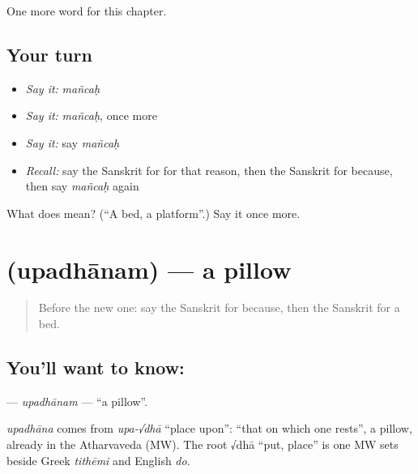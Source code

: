 \begin{grammarlens}[title={What you've built}]
One more word for this chapter.
\end{grammarlens}

\subsection*{Your turn}
\begin{itemize}
\raggedright
  \item \emph{Say it:} \emph{mañcaḥ}
  \item \emph{Say it:} \emph{mañcaḥ}, once more
  \item \emph{Say it:} say \emph{mañcaḥ}
  \item \emph{Recall:} say the Sanskrit for for that reason, then the Sanskrit for because, then say \emph{mañcaḥ} again
\end{itemize}

\begin{tcolorbox}[breakable,colback=teal!4,colframe=teal!35!black,title={Before you move on}]
What does  mean? (\textquotedblleft{}A bed, a platform\textquotedblright{}.) Say it once more.
\end{tcolorbox}
\section[\texorpdfstring{\sk{उपधानम्} (upadhānam)}{उपधानम् (upadhānam)}]{ (upadhānam) — a pillow}

\label{lesson:SA-C99-upadhanam}



\begin{quote}
Before the new one: say the Sanskrit for because, then the Sanskrit for a bed.
\end{quote}

\subsection*{You'll want to know: }
\textbf{} — \emph{upadhānam} — \textquotedblleft{}a pillow\textquotedblright{}.

\begin{cousinweb}
\emph{upadhāna} comes from \emph{upa-√dhā} \textquotedblleft{}place upon\textquotedblright{}: \textquotedblleft{}that on which one rests\textquotedblright{}, a pillow, already in the Atharvaveda (MW). The root √dhā \textquotedblleft{}put, place\textquotedblright{} is one MW sets beside Greek \emph{tithēmi} and English \emph{do}.
\end{cousinweb}

